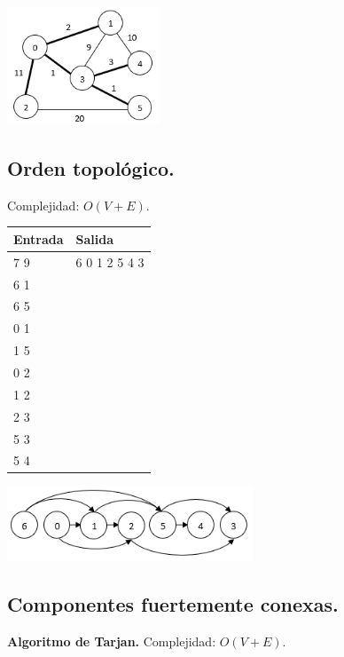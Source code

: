 \documentclass[12pt, letterpaper, twoside]{article}
\begin{document}
\begin{center}
\includegraphics[width = 0.34\textwidth]{Grafos/Imagenes/MST.png}
\end{center}

\subsection{Orden topológico.}

Complejidad: $O(V + E)$.



\begin{tabular}{|p{7cm}|p{7cm}|}
\hline
\textbf{Entrada} & \textbf{Salida}\\ \hline
7 9 & 6 0 1 2 5 4 3\\
6 1 & \\
6 5 & \\
0 1 & \\
1 5 & \\
0 2 & \\
1 2 & \\
2 3 & \\
5 3 & \\ 
5 4 & \\ \hline
\end{tabular}

\begin{center}
\includegraphics[width = 0.55\textwidth]{Grafos/Imagenes/TopoSort.png}
\end{center}

\subsection{Componentes fuertemente conexas.}

\textbf{Algoritmo de Tarjan.} Complejidad: $O(V + E)$.


\end{document}
